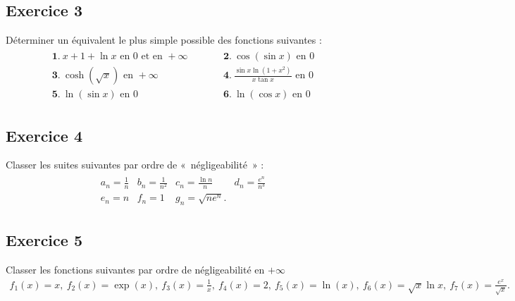 \documentclass[letterpaper,10pt,french]{jupyterBook}
\begin{document}
\subsection{Exercice 3}
\label{\detokenize{exo6:exercice-3}}
\sphinxAtStartPar
Déterminer un équivalent le plus simple possible des fonctions suivantes :
\begin{equation*}
\begin{split}
\begin{array}{lcl}
\mathbf 1.\ x+1+\ln x\textrm{ en 0 et en }+\infty&\quad\quad&\displaystyle \mathbf 2.\ \cos(\sin x)\textrm{ en 0}\\
\displaystyle \mathbf 3.\ \cosh(\sqrt x)\textrm{ en }+\infty
&\quad\quad&\displaystyle \mathbf 4.\ \frac{\sin x\ln(1+x^2)}{x\tan x}\textrm{ en 0}\\
\displaystyle \mathbf 5.\ \ln(\sin x)\textrm{ en }0
&\quad\quad&\displaystyle \mathbf 6.\ \ln(\cos x)\textrm{ en 0}
\end{array}\end{split}
\end{equation*}

\subsection{Exercice 4}
\label{\detokenize{exo6:exercice-4}}
\sphinxAtStartPar
Classer les suites suivantes par ordre de « négligeabilité » :
\begin{equation*}
\begin{split}
\begin{array}{llll}
a_n=\frac 1n&b_n=\frac1{n^2}&c_n=\frac{\ln n}n&d_n=\frac{e^n}{n^3}\\
e_n=n&f_n=1&g_n=\sqrt{ne^n}.
\end{array}\end{split}
\end{equation*}

\subsection{Exercice 5}
\label{\detokenize{exo6:exercice-5}}
\sphinxAtStartPar
Classer les fonctions suivantes par ordre de négligeabilité en \(+\infty\)
\begin{equation*}
\begin{split}
f_1(x)=x,\ f_2(x)=\exp(x),\ f_3(x)=\frac 1x,\ f_4(x)=2,\ f_5(x)=\ln(x),\ f_6(x)=\sqrt x\ln x,\ f_7(x)=\frac{e^x}{\sqrt x}.
\end{split}
\end{equation*}
\end{document}
